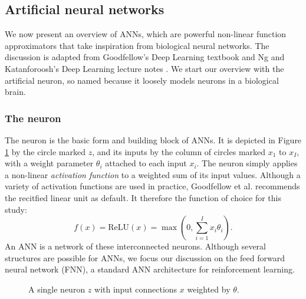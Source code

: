 \subsection{Artificial neural networks}
\label{sec:ann}
We now present an overview of ANNs, which are powerful non-linear function approximators that take inspiration from biological neural networks.
The discussion is adapted from Goodfellow's Deep Learning textbook \cite{Goodfellow2016} and Ng and Katanforoosh's Deep Learning lecture notes \cite{Ng2019}. 
We start our overview with the artificial neuron, so named because it  loosely models neurons in a biological brain. 

\subsubsection{The neuron}
The neuron is the basic form and building block of ANNs.
It is depicted in Figure \ref{fig:neuron} by the circle marked $z$, and its inputs by the column of circles marked $x_1$ to $x_I$, with a weight parameter $\theta_i$ attached to each input $x_i$. 
The neuron simply applies a non-linear \emph{activation function} to a weighted sum of its input values. 
Although a variety of activation functions are used in practice, Goodfellow et al. \cite{Goodfellow2016} recommends the recitfied linear unit as default. It therefore the function of choice for this study:
\begin{equation}
    f(x) = \text{ReLU}(x) = \max(0, \sum_{i=1}^{I}x_i \theta_i).
    \label{eq:ReLU}
\end{equation}
An ANN is a network of these interconnected neurons. Although several structures are possible for ANNs, we focus our discussion on the feed forward neural network (FNN), a standard ANN architecture for reinforcement learning.
\begin{figure}[htb!]
    \centering
    
    \caption[A single neuron]{A single neuron $z$ with input connections $x$ weighted by $\theta.$}
    \label{fig:neuron}
\end{figure}

